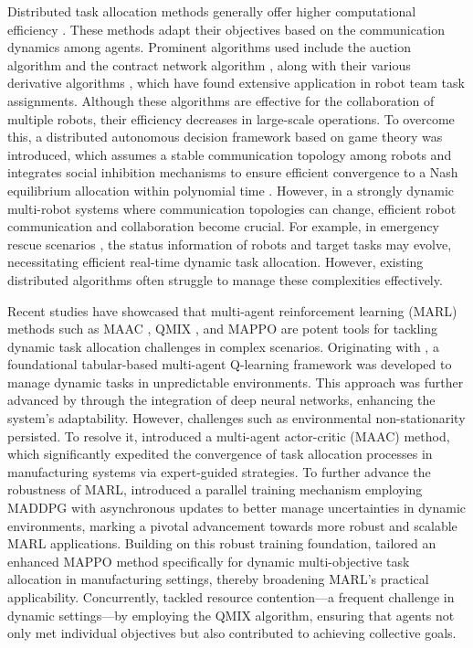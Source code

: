 \documentclass[lettersize,journal]{IEEEtran}
\begin{document}
Distributed task allocation methods generally offer higher computational efficiency \cite{zavlanos2008dynamic,panagou2019decentralized,yu2014target}. These methods adapt their objectives based on the communication dynamics among agents. Prominent algorithms used include the auction algorithm \cite{bertsekas1981new} and the contract network algorithm \cite{smith1980contract}, along with their various derivative algorithms \cite{luo2015distributed,lee2014resource,zhang2019task}, which have found extensive application in robot team task assignments. Although these algorithms are effective for the collaboration of multiple robots, their efficiency decreases in large-scale operations. To overcome this, a distributed autonomous decision framework based on game theory was introduced, which assumes a stable communication topology among robots and integrates social inhibition mechanisms to ensure efficient convergence to a Nash equilibrium allocation within polynomial time \cite{jang2018anonymous}. However, in a strongly dynamic multi-robot systems where communication topologies can change, efficient robot communication and collaboration become crucial. For example, in emergency rescue scenarios \cite{akgun2022using}, the status information of robots and target tasks may evolve, necessitating efficient real-time dynamic task allocation. However, existing distributed algorithms often struggle to manage these complexities effectively.

Recent studies have showcased that multi-agent reinforcement learning (MARL) methods such as MAAC \cite{iqbal2019actor}, QMIX \cite{chen2021nqmix}, and MAPPO \cite{yu2022surprising} are potent tools for tackling dynamic task allocation challenges in complex scenarios. Originating with \cite{gabel2008adaptive}, a foundational tabular-based multi-agent Q-learning framework was developed to manage dynamic tasks in unpredictable environments. This approach was further advanced by \cite{waschneck2018deep,waschneck2018optimization} through the integration of deep neural networks, enhancing the system’s adaptability. However, challenges such as environmental non-stationarity persisted. To resolve it,  \cite{qu2019dynamic} introduced a multi-agent actor-critic (MAAC) method, which significantly expedited the convergence of task allocation processes in manufacturing systems via expert-guided strategies. To further advance the robustness of  MARL, \cite{liu2020actor} introduced a parallel training mechanism employing MADDPG with asynchronous updates to better manage uncertainties in dynamic environments, marking a pivotal advancement towards more robust and scalable MARL applications. Building on this robust training foundation, \cite{luo2021real} tailored an enhanced MAPPO method specifically for dynamic multi-objective task allocation in manufacturing settings, thereby broadening MARL's practical applicability. Concurrently, \cite{wang2022solving} tackled resource contention—a frequent challenge in dynamic settings—by employing the QMIX algorithm, ensuring that agents not only met individual objectives but also contributed to achieving collective goals.
\end{document}
